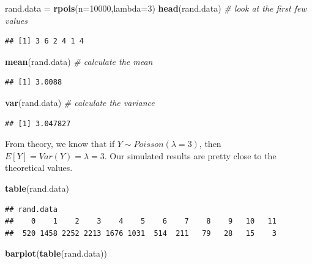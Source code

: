 \documentclass[
  11pt,
  oneside]{book}
\newenvironment{Shaded}{\begin{snugshade}}{\end{snugshade}}
\newcommand{\AttributeTok}[1]{\textcolor[rgb]{0.13,0.29,0.53}{#1}}
\newcommand{\CommentTok}[1]{\textcolor[rgb]{0.56,0.35,0.01}{\textit{#1}}}
\newcommand{\DecValTok}[1]{\textcolor[rgb]{0.00,0.00,0.81}{#1}}
\newcommand{\FunctionTok}[1]{\textcolor[rgb]{0.13,0.29,0.53}{\textbf{#1}}}
\newcommand{\NormalTok}[1]{#1}
\newcommand{\OtherTok}[1]{\textcolor[rgb]{0.56,0.35,0.01}{#1}}
\theoremstyle{definition}
\theoremstyle{definition}
\theoremstyle{definition}
\theoremstyle{definition}
\theoremstyle{remark}
\begin{document}
\begin{Shaded}
\begin{Highlighting}[]
\NormalTok{rand.data }\OtherTok{=} \FunctionTok{rpois}\NormalTok{(}\AttributeTok{n=}\DecValTok{10000}\NormalTok{,}\AttributeTok{lambda=}\DecValTok{3}\NormalTok{)}
\FunctionTok{head}\NormalTok{(rand.data) }\CommentTok{\# look at the first few values}
\end{Highlighting}
\end{Shaded}

\begin{verbatim}
## [1] 3 6 2 4 1 4
\end{verbatim}

\begin{Shaded}
\begin{Highlighting}[]
\FunctionTok{mean}\NormalTok{(rand.data) }\CommentTok{\# calculate the mean}
\end{Highlighting}
\end{Shaded}

\begin{verbatim}
## [1] 3.0088
\end{verbatim}

\begin{Shaded}
\begin{Highlighting}[]
\FunctionTok{var}\NormalTok{(rand.data) }\CommentTok{\# calculate the variance}
\end{Highlighting}
\end{Shaded}

\begin{verbatim}
## [1] 3.047827
\end{verbatim}

From theory, we know that if \(Y \sim Poisson(\lambda=3)\), then \(E[Y] = Var(Y) = \lambda = 3\). Our simulated results are pretty close to the theoretical values.

\begin{Shaded}
\begin{Highlighting}[]
\FunctionTok{table}\NormalTok{(rand.data)}
\end{Highlighting}
\end{Shaded}

\begin{verbatim}
## rand.data
##    0    1    2    3    4    5    6    7    8    9   10   11 
##  520 1458 2252 2213 1676 1031  514  211   79   28   15    3
\end{verbatim}

\begin{Shaded}
\begin{Highlighting}[]
\FunctionTok{barplot}\NormalTok{(}\FunctionTok{table}\NormalTok{(rand.data))}
\end{Highlighting}
\end{Shaded}
\end{document}
